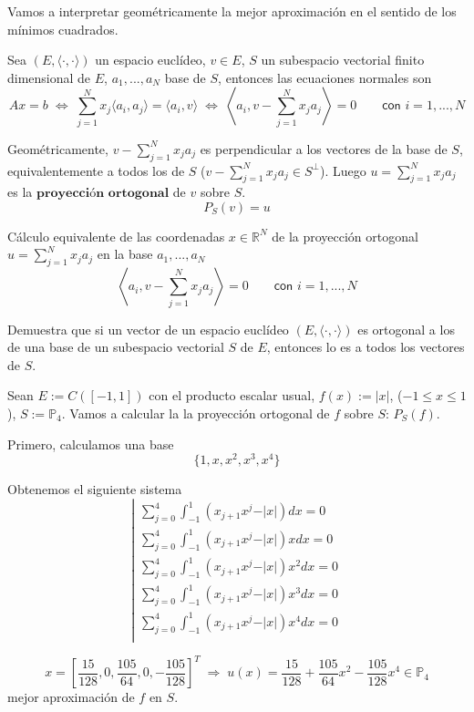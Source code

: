 Vamos a interpretar geométricamente la mejor aproximación en el sentido de los mínimos cuadrados.

Sea $(E, \langle \cdot , \cdot \rangle )$ un espacio euclídeo, $v \in E$, $S$ un subespacio vectorial finito dimensional de $E$, {$a_1,...,a_N$} base de $S$, entonces las ecuaciones normales son
\[ Ax = b \; \Leftrightarrow \; \sum_{j=1}^N x_j \langle a_i, a_j \rangle = \langle a_i, v \rangle \; \Leftrightarrow \; \left\langle a_i, v-\sum_{j=1}^N x_ja_j \right\rangle = 0 \qquad \textsf{con } i=1,...,N \]

Geométricamente, $v-\sum_{j=1}^N x_ja_j$ es perpendicular a los vectores de la base de $S$, equivalentemente a todos los de $S$ ($v-\sum_{j=1}^N x_ja_j \in S^\perp$). Luego $u = \sum_{j=1}^N x_ja_j$ es la $\textbf{proyección ortogonal}$ de $v$ sobre $S$.
\[ P_S(v) = u \]

Cálculo equivalente de las coordenadas $x \in \mathbb{R}^N$ de la proyección ortogonal $u = \sum_{j=1}^N x_ja_j$ en la base {$a_1,...,a_N$}
\[ \left\langle a_i, v - \sum_{j=1}^N x_ja_j \right\rangle = 0 \qquad \textsf{con } i = 1,...,N \]

\begin{ejer}
Demuestra que si un vector de un espacio euclídeo $(E, \langle \cdot , \cdot \rangle )$ es ortogonal a los de una base de un subespacio vectorial $S$ de $E$, entonces lo es a todos los vectores de $S$.
\end{ejer}

\begin{ejemplo}
Sean $E := C([-1,1])$ con el producto escalar usual, $f(x):= \vert x \vert$, ($-1 \leq x \leq 1$), $S:= \mathbb{P}_4$. Vamos a calcular la la proyección ortogonal de $f$ sobre $S$: $P_S(f)$.

Primero, calculamos una base
\[ \lbrace 1,x,x^2,x^3,x^4 \rbrace \]

Obtenemos el siguiente sistema
\[
\left|
\begin{array}{c}
\sum_{j=0}^4 \int_{-1}^1 (x_{j+1}x^j - \vert x \vert ) dx = 0 \\
\sum_{j=0}^4 \int_{-1}^1 (x_{j+1}x^j - \vert x \vert )x dx = 0 \\
\sum_{j=0}^4 \int_{-1}^1 (x_{j+1}x^j - \vert x \vert )x^2 dx = 0 \\
\sum_{j=0}^4 \int_{-1}^1 (x_{j+1}x^j - \vert x \vert )x^3 dx = 0 \\
\sum_{j=0}^4 \int_{-1}^1 (x_{j+1}x^j - \vert x \vert )x^4 dx = 0 \\
\end{array}
\right. \]

\[
x = \left[ \frac{15}{128}, 0, \frac{105}{64}, 0, -\frac{105}{128} \right] ^T \; \Rightarrow \; u(x) = \frac{15}{128} + \frac{105}{64}x^2 - \frac{105}{128}x^4 \in \mathbb{P} _4\]
mejor aproximación de $f$ en $S$.
\end{ejemplo}

